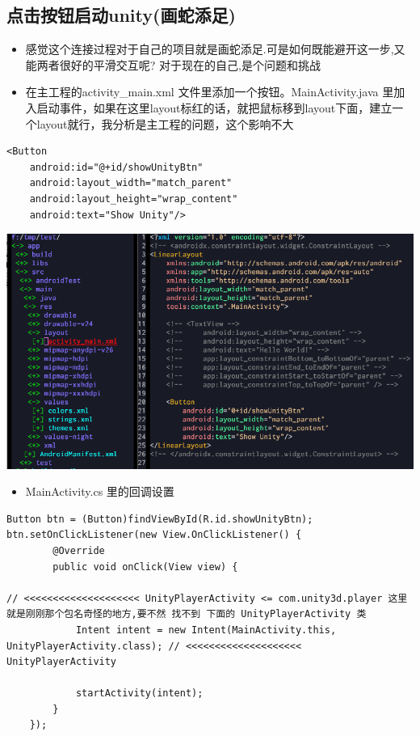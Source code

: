 \documentclass[9pt, b5paper]{article}
\begin{document}
\subsection{点击按钮启动unity(画蛇添足)}
\label{sec-5-5}
\begin{itemize}
\item 感觉这个连接过程对于自己的项目就是画蛇添足.可是如何既能避开这一步,又能两者很好的平滑交互呢? 对于现在的自己,是个问题和挑战
\item 在主工程的activity\_main.xml 文件里添加一个按钮。MainActivity.java 里加入启动事件，如果在这里layout标红的话，就把鼠标移到layout下面，建立一个layout就行，我分析是主工程的问题，这个影响不大
\end{itemize}
\begin{verbatim}
<Button
    android:id="@+id/showUnityBtn"
    android:layout_width="match_parent"
    android:layout_height="wrap_content"
    android:text="Show Unity"/>
\end{verbatim}

\includegraphics[width=.9\linewidth]{./pic/unityToAndroid_20221123_223751.png}
\begin{itemize}
\item MainActivity.cs 里的回调设置
\end{itemize}
\begin{verbatim}
Button btn = (Button)findViewById(R.id.showUnityBtn);
btn.setOnClickListener(new View.OnClickListener() {
        @Override
        public void onClick(View view) {

// <<<<<<<<<<<<<<<<<<<< UnityPlayerActivity <= com.unity3d.player 这里就是刚刚那个包名奇怪的地方,要不然 找不到 下面的 UnityPlayerActivity 类
            Intent intent = new Intent(MainActivity.this, UnityPlayerActivity.class); // <<<<<<<<<<<<<<<<<<<< UnityPlayerActivity

            startActivity(intent);
        }
    });
\end{verbatim}
\end{document}
